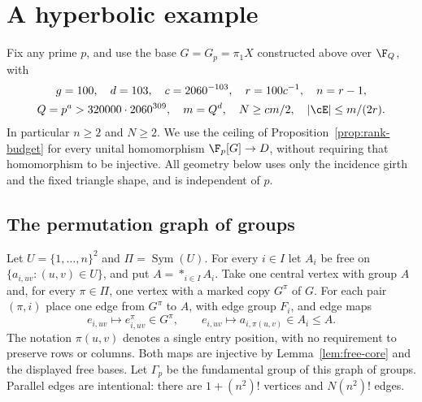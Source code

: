 \section{A hyperbolic example}\label{sec:hyperbolic}

Fix any prime \(p\), and use the base \(G=G_p=\pi_1X\) constructed
above over \(\F_Q\), with
\begin{equation}\label{eq:hyp-parameters}
 \begin{gathered}
 g=100,\quad d=103,\quad c=2060^{-103},\quad
 r=100c^{-1},\quad n=r-1,\\
 Q=p^a>320000\cdot2060^{309},\quad m=Q^d,\quad
 N\ge cm/2,\quad |\cE|\le m/(2r).
 \end{gathered}
\end{equation}
In particular \(n\ge2\) and \(N\ge2\). We use the ceiling of
Proposition~\ref{prop:rank-budget} for every unital homomorphism
\(\F_p[G]\to D\), without requiring that homomorphism to be injective.
All geometry below uses only the incidence girth and the fixed triangle
shape, and is independent of \(p\).

\subsection{The permutation graph of groups}

Let \(U=\{1,\ldots,n\}^2\) and \(\Pi=\operatorname{Sym}(U)\).
For every \(i\in I\) let \(A_i\) be free on
\(\{a_{i,uv}:(u,v)\in U\}\), and put \(A=*_{i\in I}A_i\).
Take one central vertex with group \(A\) and, for every \(\pi\in\Pi\),
one vertex with a marked copy \(G^\pi\) of \(G\). For each pair
\((\pi,i)\) place one edge from \(G^\pi\) to \(A\), with edge group
\(F_i\), and edge maps
\begin{equation}\label{eq:hyp-edge-maps}
 e_{i,uv}\longmapsto e_{i,uv}^{\pi}\in G^\pi,
 \qquad e_{i,uv}\longmapsto a_{i,\pi(u,v)}\in A_i\le A.
\end{equation}
The notation \(\pi(u,v)\) denotes a single entry position, with no
requirement to preserve rows or columns. Both maps are injective by
Lemma~\ref{lem:free-core} and the displayed free bases.
Let \(\Gamma_p\) be the fundamental group of this graph of groups.
Parallel edges are intentional: there are \(1+(n^2)!\) vertices and
\(N(n^2)!\) edges.


